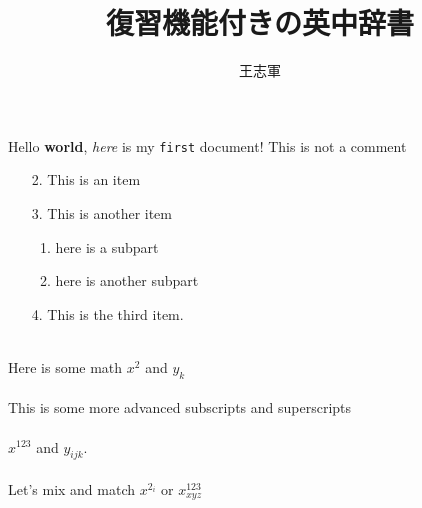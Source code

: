 \documentclass{article}
\begin{document}
  \title{復習機能付きの英中辞書}
  \author{王志軍}
  \maketitle
  
Hello \textbf{world}, \textit{here} is my \texttt{first} document!
This is not a comment

\begin{enumerate}
\item[2.] This is an item
\item[3.] This is another item
  \begin{enumerate}
    \item here is a subpart
    \item here is another subpart
  \end{enumerate}
\item[4.] This is the third item.\\ \\
\end{enumerate}

Here is some math $x^2$ and $y_k$ \\ \\
This is some more advanced subscripts and superscripts \\ \\
$x^{123}$ and $y_{ijk}$. \\ \\
Let's mix and match $x^{2_i}$ or $x^{123}_{xyz}$  \\ \\
\end{document}
